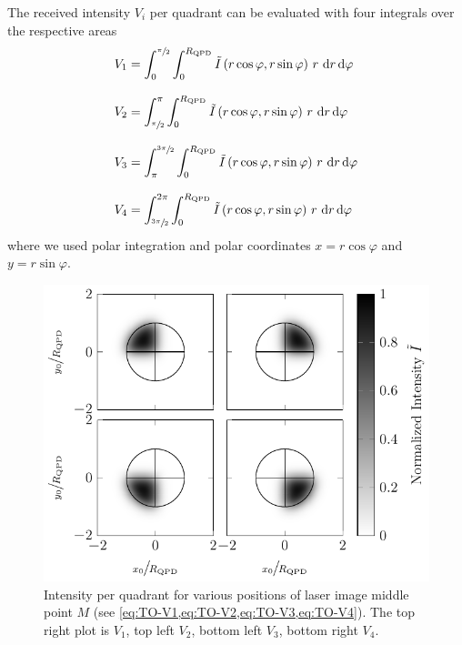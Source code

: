 The received intensity $V_{i}$ per quadrant can be evaluated with four 
integrals over the respective areas
\begin{subequations}
\begin{align}
  V_{\mathrm{1}} & = \int_{0}^{\sfrac{\pi}{2}}\int_{0}^{R_{\mathrm{QPD}}}
  \tilde{I}\left( r\cos\varphi, r\sin\varphi 
  \right)\,r\,\dd{r}\dd{\varphi}
  \label{eq:TO-V1}
  \\[3mm]
  V_{\mathrm{2}} & = \int_{\sfrac{\pi}{2}}^{\pi}\int_{0}^{R_{\mathrm{QPD}}}
  \tilde{I}\left(r\cos\varphi, 
  r\sin\varphi\right)\,r\,\dd{r}\dd{\varphi}
  \label{eq:TO-V2}
  \\[3mm]
  V_{\mathrm{3}} & = \int_{\pi}^{\sfrac{3\pi}{2}}\int_{0}^{R_{\mathrm{QPD}}}
  \tilde{I}\left(r\cos\varphi, 
  r\sin\varphi\right)\,r\,\dd{r}\dd{\varphi}
  \label{eq:TO-V3}
  \\[3mm]
  V_{\mathrm{4}} & = \int_{\sfrac{3\pi}{2}}^{2\pi}\int_{0}^{R_{\mathrm{QPD}}}
  \tilde{I}\left(r\cos\varphi, 
  r\sin\varphi\right)\,r\,\dd{r}\dd{\varphi}
  \label{eq:TO-V4}
\end{align}
\end{subequations}
where we used polar integration and polar coordinates $x=r\cos\varphi$ and 
$y=r\sin\varphi$.

\begin{figure}[tbp]
  \centering
  \includegraphics[]{Plots/cache/V_quadrant.pdf}
  \caption{Intensity per quadrant for various positions of laser image middle 
    point $M$ (see \cref{eq:TO-V1,eq:TO-V2,eq:TO-V3,eq:TO-V4}). The top right 
  plot is $V_{1}$, top left $V_{2}$, bottom left $V_{3}$, bottom right 
$V_{4}$.}
  \label{fig:TO-quadrant_Intensity}
\end{figure}

